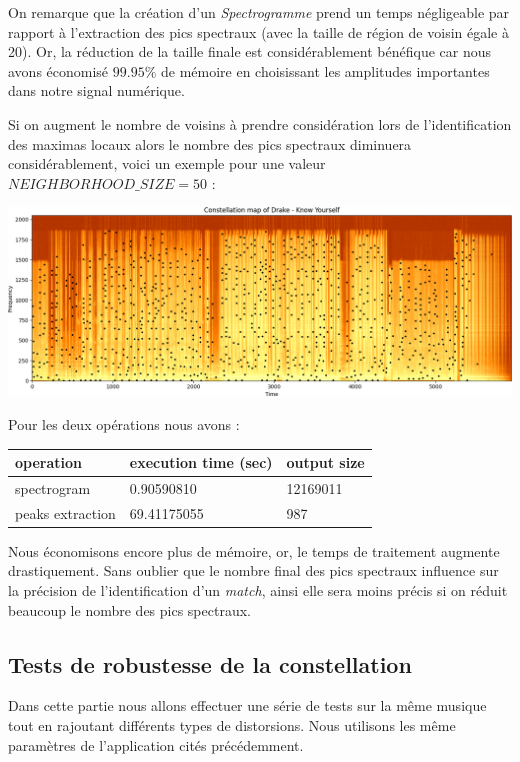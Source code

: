 \documentclass[11pt, report, french]{scrreprt}
\begin{document}
On remarque que la création d'un \textit{Spectrogramme} prend un temps négligeable par rapport à l'extraction des pics spectraux (avec la taille de région de voisin égale à 20). Or, la réduction de la taille finale est considérablement bénéfique car nous avons économisé $99.95\%$ de mémoire en choisissant les amplitudes importantes dans notre signal numérique.

\newpage
Si on augment le nombre de voisins à prendre considération lors de l'identification des maximas locaux alors le nombre des pics spectraux diminuera considérablement, voici un exemple pour une valeur $NEIGHBORHOOD\_SIZE = 50$ :

\begin{center}
	\includegraphics[scale=0.5]{img/constallation_drake_50.png}
\end{center}

Pour les deux opérations nous avons :

\begin{center}
	\begin{tabular}{ | m{3cm} || m{4cm}| m{4cm} | } 
		\hline
		operation & execution time (sec) & output size \\ 
		\hline
		\hline
		spectrogram & 0.90590810 & 12169011 \\ 
		\hline
		peaks extraction & 69.41175055 & 987 \\ 
		\hline
	\end{tabular}
\end{center}

Nous économisons encore plus de mémoire, or, le temps de traitement augmente drastiquement. Sans oublier que le nombre final des pics spectraux influence sur la précision de l'identification d'un \textit{match}, ainsi elle sera moins précis si on réduit beaucoup le nombre des pics spectraux.

\subsection{Tests de robustesse de la constellation}
Dans cette partie nous allons effectuer une série de tests sur la même musique tout en rajoutant différents types de distorsions. Nous utilisons les même paramètres de l'application cités précédemment.
\end{document}
